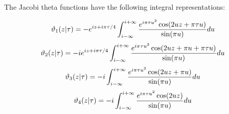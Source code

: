 \documentclass[12pt]{article}
\begin{document}
The Jacobi theta functions have the following integral representations:

 $$\vartheta_1 (z | \tau) = -e^{iz + i \pi \tau / 4} \int_{i - \infty}^{i + \infty} {e^{i \pi \tau u^2} \cos (2 u z + \pi \tau u) \over \sin (\pi u)} du$$
 $$\vartheta_2 (z | \tau) = -i e^{iz + i \pi \tau / 4} \int_{i - \infty}^{i + \infty} {e^{i \pi \tau u^2} \cos (2 u z + \pi u + \pi \tau u) \over \sin (\pi u)} du$$
 $$\vartheta_3 (z | \tau) = -i \int_{i - \infty}^{i + \infty} {e^{i \pi \tau u^2} \cos (2 u z + \pi u) \over \sin (\pi u)} du$$
 $$\vartheta_4 (z | \tau) = -i \int_{i - \infty}^{i + \infty} {e^{i \pi \tau u^2} \cos (2 u z) \over \sin (\pi u)} du$$
\end{document}
